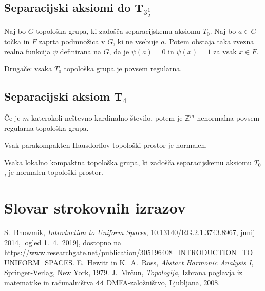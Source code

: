 \documentclass[mat1]{fmfdelo}
\newcommand{\Z}{\mathbb Z}
\begin{document}
\subsection{Separacijski aksiomi do T$_{3 \frac{1}{2}}$}

\begin{izrek}\label{izr:t3pol}
	Naj bo $G$ topološka grupa, ki zadošča separacijskemu aksiomu $T_0$. Naj bo $a \in G$ točka in $F$ zaprta podmnožica v $G$, ki ne vsebuje $a$. Potem obstaja taka zvezna realna funkcija $\psi$ definirana na $G$, da je $\psi (a) = 0$ in $\psi (x) = 1$ za vsak $x \in F$.
	
	Drugače: vsaka $T_0$ topološka grupa je povsem regularna.
\end{izrek}

\subsection{Separacijski aksiom T$_4$}
\begin{izrek}\label{izr:t4protiprimer}
	Če je $m$ katerokoli neštevno kardinalno število, potem je $\Z^{m}$ nenormalna povsem regularna topološka grupa.
\end{izrek}

\begin{trditev}\label{trd:parkompnorm} %
Vsak parakompakten Hausdorffov topološki prostor je normalen.
\end{trditev}

\begin{izrek}\label{izr:t4}
	Vsaka lokalno kompaktna topološka grupa, ki zadošča separacijskemu aksiomu $T_0$, je normalen topološki prostor.
\end{izrek}

\section*{Slovar strokovnih izrazov}

\geslo{}{}
\geslo{}{}

\begin{thebibliography}{99}

S.~Bhowmik, \emph{Introduction to Uniform Spaces}, 10.13140/RG.2.1.3743.8967, junij 2014, [ogled 1.~4.~2019], dostopno na \url{https://www.researchgate.net/publication/305196408_INTRODUCTION_TO_UNIFORM_SPACES}.
E.~Hewitt in K.~A.~Ross, \emph{Abstact Harmonic Analysis I}, Springer-Verlag, New York, 1979.
J.~Mrčun, \emph{Topologija}, Izbrana poglavja iz matematike in računalništva \textbf{44} DMFA-založništvo, Ljubljana, 2008.

\end{thebibliography}
\end{document}
